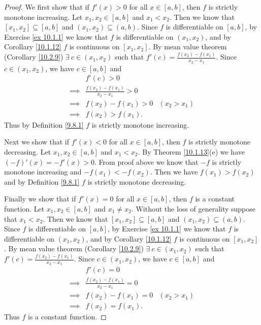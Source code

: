 \begin{proof}
    We first show that if \(f'(x) > 0\) for all \(x \in [a, b]\), then \(f\) is strictly monotone increasing.
    Let \(x_1, x_2 \in [a, b]\) and \(x_1 < x_2\).
    Then we know that \([x_1, x_2] \subseteq [a, b]\) and \((x_1, x_2) \subseteq (a, b)\).
    Since \(f\) is differentiable on \([a, b]\), by Exercise \ref{ex 10.1.1} we know that \(f\) is differentiable on \((x_1, x_2)\), and by Corollary \ref{10.1.12} \(f\) is continuous on \([x_1, x_2]\).
    By mean value theorem (Corollary \ref{10.2.9}) \(\exists\ c \in (x_1, x_2)\) such that \(f'(c) = \frac{f(x_2) - f(x_1)}{x_2 - x_1}\).
    Since \(c \in (x_1, x_2)\), we have \(c \in [a, b]\) and
    \begin{align*}
                 & f'(c) > 0                                           \\
        \implies & \frac{f(x_2) - f(x_1)}{x_2 - x_1} > 0               \\
        \implies & f(x_2) - f(x_1) > 0                   & (x_2 > x_1) \\
        \implies & f(x_2) > f(x_1).
    \end{align*}
    Thus by Definition \ref{9.8.1} \(f\) is strictly monotone increasing.

    Next we show that if \(f'(x) < 0\) for all \(x \in [a, b]\), then \(f\) is strictly monotone decreasing.
    Let \(x_1, x_2 \in [a, b]\) and \(x_1 < x_2\).
    By Theorem \ref{10.1.13}(e) we have \((-f)'(x) = -f'(x) > 0\).
    From proof above we know that \(-f\) is strictly monotone increasing and \(-f(x_1) < -f(x_2)\).
    Then we have \(f(x_1) > f(x_2)\) and by Definition \ref{9.8.1} \(f\) is strictly monotone decreasing.

    Finally we show that if \(f'(x) = 0\) for all \(x \in [a, b]\), then \(f\) is a constant function.
    Let \(x_1, x_2 \in [a, b]\) and \(x_1 \neq x_2\).
    Without the loss of generality suppose that \(x_1 < x_2\).
    Then we know that \([x_1, x_2] \subseteq [a, b]\) and \((x_1, x_2) \subseteq (a, b)\).
    Since \(f\) is differentiable on \([a, b]\), by Exercise \ref{ex 10.1.1} we know that \(f\) is differentiable on \((x_1, x_2)\), and by Corollary \ref{10.1.12} \(f\) is continuous on \([x_1, x_2]\).
    By mean value theorem (Corollary \ref{10.2.9}) \(\exists\ c \in (x_1, x_2)\) such that \(f'(c) = \frac{f(x_2) - f(x_1)}{x_2 - x_1}\).
    Since \(c \in (x_1, x_2)\), we have \(c \in [a, b]\) and
    \begin{align*}
                 & f'(c) = 0                                           \\
        \implies & \frac{f(x_2) - f(x_1)}{x_2 - x_1} = 0               \\
        \implies & f(x_2) - f(x_1) = 0                   & (x_2 > x_1) \\
        \implies & f(x_2) = f(x_1).
    \end{align*}
    Thus \(f\) is a constant function.
\end{proof}

